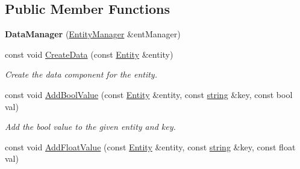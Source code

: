 \subsection*{Public Member Functions}
\begin{DoxyCompactItemize}
\item 
{\bfseries Data\+Manager} (\hyperlink{class_ensum_1_1_components_1_1_entity_manager}{Entity\+Manager} \&ent\+Manager)\hypertarget{class_ensum_1_1_components_1_1_data_manager_ad388bb6d19c8eaca2d7c1fbfc3c2a889}{}\label{class_ensum_1_1_components_1_1_data_manager_ad388bb6d19c8eaca2d7c1fbfc3c2a889}

\item 
const void \hyperlink{class_ensum_1_1_components_1_1_data_manager_ade29bf76080dd342aba5e559fdba012e}{Create\+Data} (const \hyperlink{struct_ensum_1_1_components_1_1_entity}{Entity} \&entity)\hypertarget{class_ensum_1_1_components_1_1_data_manager_ade29bf76080dd342aba5e559fdba012e}{}\label{class_ensum_1_1_components_1_1_data_manager_ade29bf76080dd342aba5e559fdba012e}

\begin{DoxyCompactList}\small\item\em Create the data component for the entity. \end{DoxyCompactList}\item 
const void \hyperlink{class_ensum_1_1_components_1_1_data_manager_a9564b3867e85330db4e6b7b78d81645a}{Add\+Bool\+Value} (const \hyperlink{struct_ensum_1_1_components_1_1_entity}{Entity} \&entity, const \hyperlink{class_ensum_1_1string}{string} \&key, const bool val)\hypertarget{class_ensum_1_1_components_1_1_data_manager_a9564b3867e85330db4e6b7b78d81645a}{}\label{class_ensum_1_1_components_1_1_data_manager_a9564b3867e85330db4e6b7b78d81645a}

\begin{DoxyCompactList}\small\item\em Add the bool value to the given entity and key. \end{DoxyCompactList}\item 
const void \hyperlink{class_ensum_1_1_components_1_1_data_manager_afba14ae03a656e9aa5918fac195d479c}{Add\+Float\+Value} (const \hyperlink{struct_ensum_1_1_components_1_1_entity}{Entity} \&entity, const \hyperlink{class_ensum_1_1string}{string} \&key, const float val)\hypertarget{class_ensum_1_1_components_1_1_data_manager_afba14ae03a656e9aa5918fac195d479c}{}\label{class_ensum_1_1_components_1_1_data_manager_afba14ae03a656e9aa5918fac195d479c}


\end{DoxyCompactItemize}
